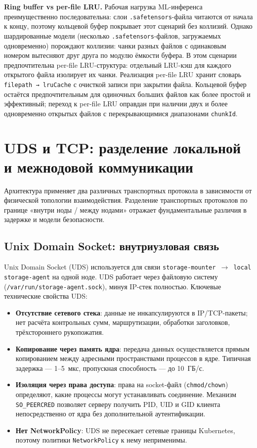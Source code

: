 \textbf{Ring buffer vs per-file LRU.} Рабочая нагрузка ML-инференса преимущественно последовательна: слои \texttt{.safetensors}-файла читаются от начала к концу, поэтому кольцевой буфер покрывает этот сценарий без коллизий. Однако шардированные модели (несколько \texttt{.safetensors}-файлов, загружаемых одновременно) порождают коллизии: чанки разных файлов с одинаковым номером вытесняют друг друга по модулю ёмкости буфера. В этом сценарии предпочтительна per-file LRU-структура: отдельный LRU-кэш для каждого открытого файла изолирует их чанки. Реализация per-file LRU хранит словарь \texttt{filepath → lruCache} с очисткой записи при закрытии файла. Кольцевой буфер остаётся предпочтительным для одиночных больших файлов как более простой и эффективный; переход к per-file LRU оправдан при наличии двух и более одновременно открытых файлов с перекрывающимися диапазонами \texttt{chunkId}.

\section{UDS и TCP: разделение локальной и межнодовой коммуникации}

Архитектура применяет два различных транспортных протокола в зависимости от физической топологии взаимодействия. Разделение транспортных протоколов по границе «внутри ноды / между нодами» отражает фундаментальные различия в задержке и модели безопасности.

\subsection*{Unix Domain Socket: внутриузловая связь}

Unix Domain Socket (UDS) используется для связи \texttt{storage-mounter $\to$ local storage-agent} на одной ноде. UDS работает через файловую систему (\texttt{/var/run/storage-agent.sock}), минуя IP-стек полностью. Ключевые технические свойства UDS:

\begin{itemize}[leftmargin=*]
  \item \textbf{Отсутствие сетевого стека}: данные не инкапсулируются в IP/TCP-пакеты; нет расчёта контрольных сумм, маршрутизации, обработки заголовков, трёхстороннего рукопожатия.
  \item \textbf{Копирование через память ядра}: передача данных осуществляется прямым копированием между адресными пространствами процессов в ядре. Типичная задержка --- 1--5~мкс, пропускная способность --- до 10~ГБ/с.
  \item \textbf{Изоляция через права доступа}: права на socket-файл (\texttt{chmod/chown}) определяют, какие процессы могут устанавливать соединение. Механизм \texttt{SO\_PEERCRED} позволяет серверу получить PID, UID и GID клиента непосредственно от ядра без дополнительной аутентификации.
  \item \textbf{Нет NetworkPolicy}: UDS не пересекает сетевые границы Kubernetes, поэтому политики \texttt{NetworkPolicy} к нему неприменимы.
\end{itemize}

